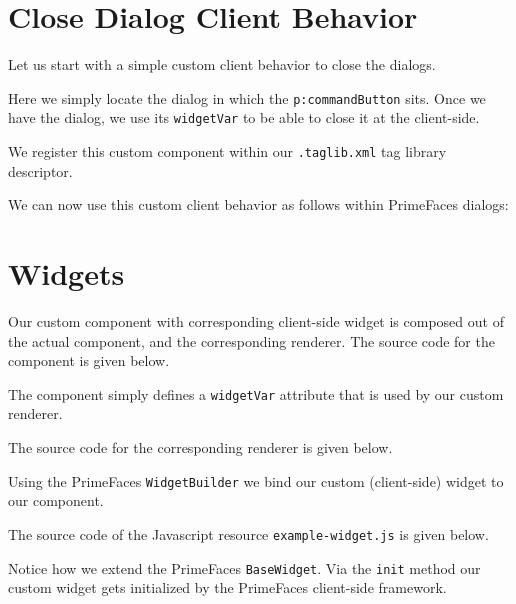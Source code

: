 

\section{Close Dialog Client Behavior}
Let us start with a simple custom client behavior to close the dialogs.

Here we simply locate the dialog in which the \texttt{p:commandButton} sits.
Once we have the dialog, we use its \texttt{widgetVar} to be able to close it at the client-side.

We register this custom component within our \texttt{.taglib.xml} tag library descriptor.


We can now use this custom client behavior as follows within PrimeFaces dialogs:



\section{Widgets}
Our custom component with corresponding client-side widget is composed out of the actual component, and the corresponding renderer.
The source code for the component is given below.

The component simply defines a \texttt{widgetVar} attribute that is used by our custom renderer.

The source code for the corresponding renderer is given below.

Using the PrimeFaces \texttt{WidgetBuilder} we bind our custom (client-side) widget to our component.

The source code of the Javascript resource \texttt{example-widget.js} is given below.

Notice how we extend the PrimeFaces \texttt{BaseWidget}. Via the \texttt{init} method our custom widget gets initialized by the PrimeFaces client-side framework.

